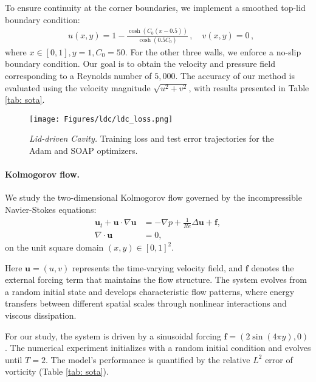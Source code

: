 To ensure continuity at the corner boundaries, we implement a smoothed top-lid boundary condition:
\begin{align}
& u(x, y)=1-\frac{\cosh \left(C_0(x-0.5)\right)}{\cosh \left(0.5 C_0\right)}\,, \quad v(x, y)=0\,,
\end{align}
where $x \in [0, 1], y=1, C_0 = 50$. For the other three walls, we enforce a no-slip boundary condition. Our goal is to obtain the velocity and pressure field corresponding to a Reynolds number of $5,000$.  The accuracy of our method is evaluated using the velocity magnitude $\sqrt{u^2 + v^2}$, with results presented in Table \ref{tab: sota}.



\begin{figure}
    \centering
    \texttt{[image: Figures/ldc/ldc\_loss.png]}
  \caption{{\em Lid-driven Cavity.} Training loss and test error trajectories for the Adam and SOAP optimizers.}
    \label{fig:ldc_loss}
\end{figure}







\paragraph{Kolmogorov flow.}  We study the two-dimensional Kolmogorov flow governed by the incompressible Navier-Stokes equations:
\begin{align*}
\mathbf{u}_t + \mathbf{u} \cdot \nabla \mathbf{u} & =- \nabla p + \frac{1}{R e} \Delta \mathbf{u} + \mathbf{f}, \\
\nabla \cdot \mathbf{u} & =0,
\end{align*}
on the unit square domain $(x,y) \in [0, 1]^2$.  

Here $\mathbf{u} = (u,v)$ represents the time-varying velocity field, and $\mathbf{f}$ denotes the external forcing term that maintains the flow structure. The system evolves from a random initial state and develops characteristic flow patterns, where energy transfers between different spatial scales through nonlinear interactions and viscous dissipation.

For our study, the system is driven by a sinusoidal forcing $\mathbf{f} =(2 \sin(4 \pi y), 0)$. The numerical experiment initializes with a random initial condition and evolves until $T=2$. The model's performance is quantified by the relative $L^2$ error of vorticity (Table \ref{tab: sota}).






